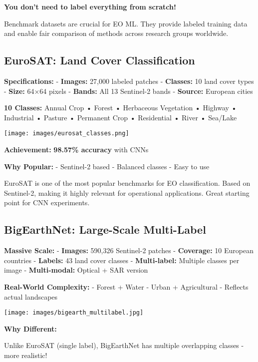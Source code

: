 \documentclass[
  letterpaper,
  DIV=11,
  numbers=noendperiod]{scrartcl}
\begin{document}
\textbf{You don't need to label everything from scratch!}

Benchmark datasets are crucial for EO ML. They provide labeled training
data and enable fair comparison of methods across research groups
worldwide.

\subsection{EuroSAT: Land Cover
Classification}\label{eurosat-land-cover-classification}

\textbf{Specifications:} - \textbf{Images:} 27,000 labeled patches -
\textbf{Classes:} 10 land cover types - \textbf{Size:} 64×64 pixels -
\textbf{Bands:} All 13 Sentinel-2 bands - \textbf{Source:} European
cities

\textbf{10 Classes:} Annual Crop • Forest • Herbaceous Vegetation •
Highway • Industrial • Pasture • Permanent Crop • Residential • River •
Sea/Lake

\texttt{[image: images/eurosat\_classes.png]}

\textbf{Achievement:} \textbf{98.57\% accuracy} with CNNs

\textbf{Why Popular:} - Sentinel-2 based - Balanced classes - Easy to
use

EuroSAT is one of the most popular benchmarks for EO classification.
Based on Sentinel-2, making it highly relevant for operational
applications. Great starting point for CNN experiments.

\subsection{BigEarthNet: Large-Scale
Multi-Label}\label{bigearthnet-large-scale-multi-label}

\textbf{Massive Scale:} - \textbf{Images:} 590,326 Sentinel-2 patches -
\textbf{Coverage:} 10 European countries - \textbf{Labels:} 43 land
cover classes - \textbf{Multi-label:} Multiple classes per image -
\textbf{Multi-modal:} Optical + SAR version

\textbf{Real-World Complexity:} - Forest + Water - Urban + Agricultural
- Reflects actual landscapes

\texttt{[image: images/bigearth\_multilabel.jpg]}

\textbf{Why Different:}

Unlike EuroSAT (single label), BigEarthNet has multiple overlapping
classes - more realistic!
\end{document}

